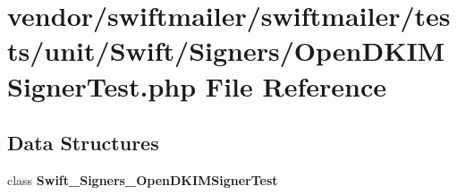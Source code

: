 \section{vendor/swiftmailer/swiftmailer/tests/unit/\+Swift/\+Signers/\+Open\+D\+K\+I\+M\+Signer\+Test.php File Reference}
\label{_open_d_k_i_m_signer_test_8php}
\subsection*{Data Structures}
\begin{DoxyCompactItemize}
\item 
class {\bf Swift\+\_\+\+Signers\+\_\+\+Open\+D\+K\+I\+M\+Signer\+Test}
\end{DoxyCompactItemize}

